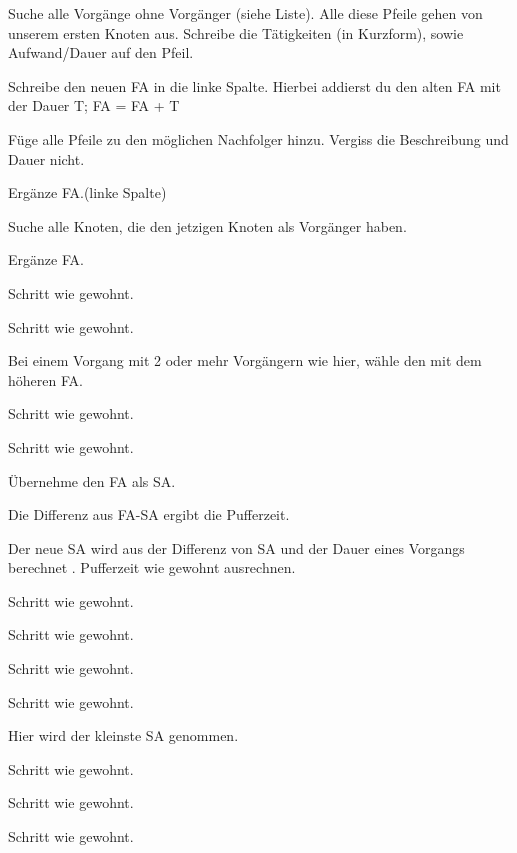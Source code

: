 \documentclass{beamer}
\begin{document}
\begin{frame}[t,shrink=65]
\begin{columns}
\begin{itemize}
{    \item<only@+> {Suche alle Vorgänge ohne Vorgänger (siehe Liste). Alle diese Pfeile gehen von unserem ersten Knoten aus. Schreibe die Tätigkeiten (in Kurzform), sowie Aufwand/Dauer auf den Pfeil.}
    \item<only@+> {Schreibe den neuen FA in die linke Spalte. Hierbei addierst du den alten FA mit der Dauer T;
                   FA = FA + T}
    \item<only@+> {Füge alle Pfeile zu den möglichen Nachfolger hinzu. Vergiss die Beschreibung und Dauer nicht.}
    \item<only@+> {Ergänze FA.(linke Spalte)}
    \item<only@+> {Suche alle Knoten, die den jetzigen Knoten als Vorgänger haben.}
    \item<only@+> {Ergänze FA.}
    \item<only@+> {Schritt wie gewohnt.}
    \item<only@+> {Schritt wie gewohnt.}
    \item<only@+> {Bei einem Vorgang mit 2 oder mehr Vorgängern wie hier, wähle den mit dem höheren FA.}
    \item<only@+> {Schritt wie gewohnt.}
    \item<only@+> {Schritt wie gewohnt.}
    \item<only@+> {Übernehme den FA als SA.}
    \item<only@+> {Die Differenz aus FA-SA ergibt die Pufferzeit.}
    \item<only@+> {Der neue SA wird aus der Differenz von SA und der Dauer eines Vorgangs berechnet . Pufferzeit wie gewohnt ausrechnen.}
    \item<only@+> {Schritt wie gewohnt.}
    \item<only@+> {Schritt wie gewohnt.}
    \item<only@+> {Schritt wie gewohnt.}
    \item<only@+> {Schritt wie gewohnt.}
    \item<only@+> {Hier wird der kleinste SA genommen.}
    \item<only@+> {Schritt wie gewohnt.}
    \item<only@+> {Schritt wie gewohnt.}
    \item<only@+> {Schritt wie gewohnt.}
    \item \alert<+> {}
}

\end{itemize}

\par\vspace{2cm}\noindent %


\end{columns}
\end{frame}
\end{document}
